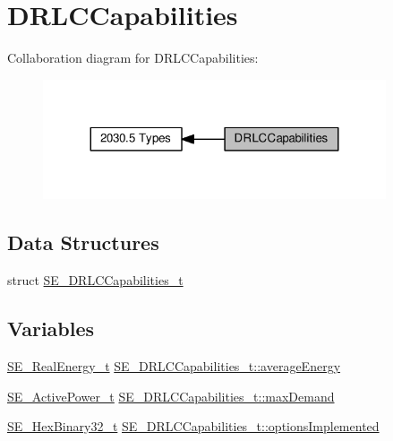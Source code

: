 \hypertarget{group__DRLCCapabilities}{}\section{D\+R\+L\+C\+Capabilities}
\label{group__DRLCCapabilities}
Collaboration diagram for D\+R\+L\+C\+Capabilities\+:\nopagebreak
\begin{figure}[H]
\begin{center}
\leavevmode
\includegraphics[width=287pt]{group__DRLCCapabilities}
\end{center}
\end{figure}
\subsection*{Data Structures}
\begin{DoxyCompactItemize}
\item 
struct \hyperlink{structSE__DRLCCapabilities__t}{S\+E\+\_\+\+D\+R\+L\+C\+Capabilities\+\_\+t}
\end{DoxyCompactItemize}
\subsection*{Variables}
\begin{DoxyCompactItemize}
\item 
\hyperlink{structSE__RealEnergy__t}{S\+E\+\_\+\+Real\+Energy\+\_\+t} \hyperlink{group__DRLCCapabilities_ga6e021a85ef95aff057ee874c073e496e}{S\+E\+\_\+\+D\+R\+L\+C\+Capabilities\+\_\+t\+::average\+Energy}
\item 
\hyperlink{structSE__ActivePower__t}{S\+E\+\_\+\+Active\+Power\+\_\+t} \hyperlink{group__DRLCCapabilities_ga5a0d146e5a4e0b544873034fb4d8b0a4}{S\+E\+\_\+\+D\+R\+L\+C\+Capabilities\+\_\+t\+::max\+Demand}
\item 
\hyperlink{group__HexBinary32_ga062e99a233c4875284116657d048bb98}{S\+E\+\_\+\+Hex\+Binary32\+\_\+t} \hyperlink{group__DRLCCapabilities_gaea3195869d953f2caa66af4cadd8b567}{S\+E\+\_\+\+D\+R\+L\+C\+Capabilities\+\_\+t\+::options\+Implemented}
\end{DoxyCompactItemize}


